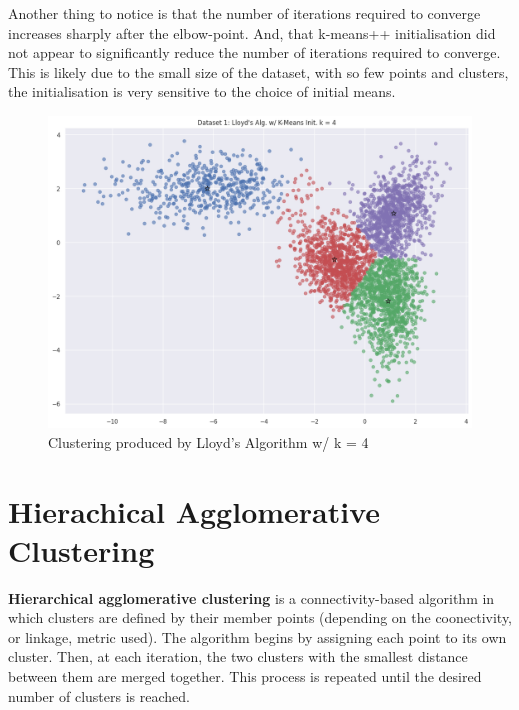 \documentclass[12pt]{article}
\begin{document}
Another thing to notice is that the number of iterations required to converge increases
sharply after the elbow-point. And, that k-means++ initialisation did not appear to
significantly reduce the number of iterations required to converge. This is likely
due to the small size of the dataset, with so few points and clusters, the initialisation
is very sensitive to the choice of initial means.

\begin{figure}[h]
    \centering
    \includegraphics[width=\linewidth]{7.png}
    \caption{Clustering produced by Lloyd's Algorithm w/ k = 4}
    \label{fig:dist_1}
\end{figure}

\section{Hierachical Agglomerative Clustering}

\textbf{Hierarchical agglomerative clustering} is a connectivity-based
algorithm in which clusters are defined by their member points (depending on the
coonectivity, or linkage, metric used). The algorithm begins by assigning each
point to its own cluster. Then, at each iteration, the two clusters with the
smallest distance between them are merged together. This process is repeated 
until the desired number of clusters is reached.
\end{document}

